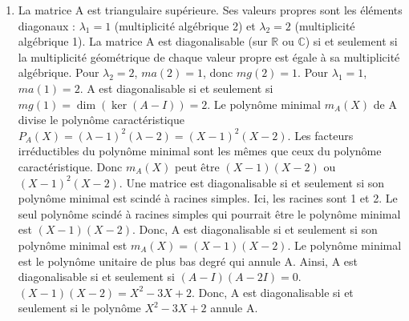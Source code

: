 \begin{solution}
\begin{enumerate}
    \item La matrice A est triangulaire supérieure. Ses valeurs propres sont les éléments diagonaux : $\lambda_1 = 1$ (multiplicité algébrique 2) et $\lambda_2 = 2$ (multiplicité algébrique 1).
    La matrice A est diagonalisable (sur $\mathbb{R}$ ou $\mathbb{C}$) si et seulement si la multiplicité géométrique de chaque valeur propre est égale à sa multiplicité algébrique.
    Pour $\lambda_2 = 2$, $ma(2) = 1$, donc $mg(2)=1$.
    Pour $\lambda_1 = 1$, $ma(1) = 2$. A est diagonalisable si et seulement si $mg(1) = \dim(\ker(A-I)) = 2$.
    Le polynôme minimal $m_A(X)$ de A divise le polynôme caractéristique $P_A(X) = (\lambda-1)^2 (\lambda-2) = (X-1)^2(X-2)$.
    Les facteurs irréductibles du polynôme minimal sont les mêmes que ceux du polynôme caractéristique. Donc $m_A(X)$ peut être $(X-1)(X-2)$ ou $(X-1)^2(X-2)$.
    Une matrice est diagonalisable si et seulement si son polynôme minimal est scindé à racines simples.
    Ici, les racines sont 1 et 2. Le seul polynôme scindé à racines simples qui pourrait être le polynôme minimal est $(X-1)(X-2)$.
    Donc, A est diagonalisable si et seulement si son polynôme minimal est $m_A(X) = (X-1)(X-2)$.
    Le polynôme minimal est le polynôme unitaire de plus bas degré qui annule A.
    Ainsi, A est diagonalisable si et seulement si $(A-I)(A-2I) = 0$.
    $(X-1)(X-2) = X^2 - 3X + 2$.
    Donc, A est diagonalisable si et seulement si le polynôme $X^2 - 3X + 2$ annule A.


\end{enumerate}
\end{solution}
